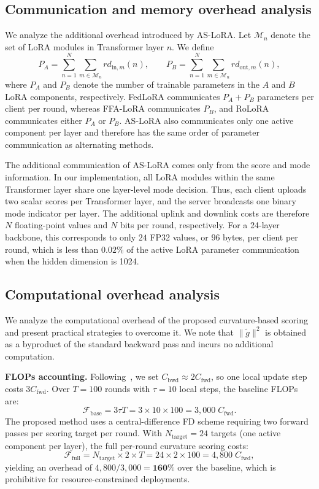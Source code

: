 \subsection{Communication and memory overhead analysis} \label{app:communication_overhead}
We analyze the additional overhead introduced by AS-LoRA. Let $\mathcal{M}_n$
denote the set of LoRA modules in Transformer layer $n$. We define
\[
P_A=\sum_{n=1}^{N}\sum_{m\in\mathcal{M}_n} r d_{\mathrm{in},m}(n),
\qquad
P_B=\sum_{n=1}^{N}\sum_{m\in\mathcal{M}_n} r d_{\mathrm{out},m}(n),
\]
where $P_A$ and $P_B$ denote the number of trainable parameters in the $A$ and
$B$ LoRA components, respectively. FedLoRA communicates $P_A+P_B$ parameters
per client per round, whereas FFA-LoRA communicates $P_B$, and RoLoRA
communicates either $P_A$ or $P_B$. AS-LoRA also communicates only one active
component per layer and therefore has the same order of parameter communication
as alternating methods.

The additional communication of AS-LoRA comes only from the score and mode
information. In our implementation, all LoRA modules within the same Transformer
layer share one layer-level mode decision. Thus, each client uploads two scalar
scores per Transformer layer, and the server broadcasts one binary mode
indicator per layer. The additional uplink and downlink costs are therefore
$N$ floating-point values and $N$ bits per round, respectively. For a 24-layer
backbone, this corresponds to only $24$ FP32 values, or $96$ bytes, per client
per round, which is less than $0.02\%$ of the active LoRA parameter
communication when the hidden dimension is 1024.
\subsection{Computational overhead analysis}  \label{app:computational_overhead}

We analyze the computational overhead of the proposed curvature-based 
scoring and present practical strategies to overcome it.
We note that $\|\tilde{g}\|^2$ is obtained as a byproduct of the 
standard backward pass and incurs no additional computation.

\textbf{FLOPs accounting.}
Following~\cite{kaplan2020scaling}, we set $C_{\mathrm{bwd}} \approx 2C_{\mathrm{fwd}}$, 
so one local update step costs $3C_{\mathrm{fwd}}$.
Over $T=100$ rounds with $\tau=10$ local steps, the baseline FLOPs are:
\[
\mathcal{F}_{\mathrm{base}} = 3\tau T = 3 \times 10 \times 100 = 3{,}000\;C_{\mathrm{fwd}}.
\]
The proposed method uses a central-difference FD scheme requiring 
two forward passes per scoring target per round.
With $N_{\mathrm{target}} = 24$ targets (one active component per layer), 
the full per-round curvature scoring costs:
\[
\mathcal{F}_{\mathrm{full}} = N_{\mathrm{target}} \times 2 \times T
= 24 \times 2 \times 100 = 4{,}800\;C_{\mathrm{fwd}},
\]
yielding an overhead of $4{,}800 / 3{,}000 = \mathbf{160\%}$ over the baseline,
which is prohibitive for resource-constrained deployments.

